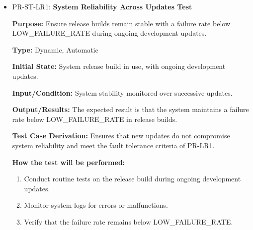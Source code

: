 \documentclass[12pt, titlepage]{article}
\begin{document}
\begin{itemize}
  \item PR-ST-LR1: \textbf{System Reliability Across Updates Test}
  \begin{mdframed}[linewidth=0.5mm]
      \textbf{Purpose:} Ensure release builds remain stable with a failure rate below \\ LOW\_FAILURE\_RATE during ongoing development updates. \par
      \textbf{Type:} Dynamic, Automatic \par
      \textbf{Initial State:} System release build in use, with ongoing development updates. \par
      \textbf{Input/Condition:} System stability monitored over successive updates. \par
      \textbf{Output/Results:} The expected result is that the system maintains a failure rate below LOW\_FAILURE\_RATE in release builds. \par
      \textbf{Test Case Derivation:} Ensures that new updates do not compromise system reliability and meet the fault tolerance criteria of PR-LR1. \par
      \textbf{How the test will be performed:}
      \begin{enumerate}[noitemsep]
        \item Conduct routine tests on the release build during ongoing development updates.
        \item Monitor system logs for errors or malfunctions.
        \item Verify that the failure rate remains below LOW\_FAILURE\_RATE.
      \end{enumerate}
  \end{mdframed}


\end{itemize}
\end{document}
